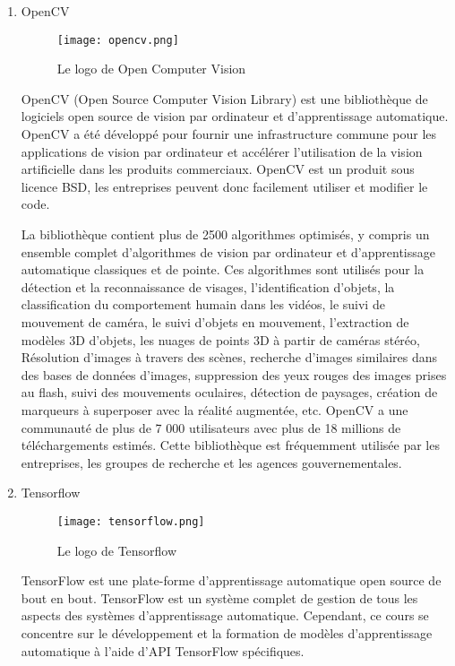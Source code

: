 \begin{enumerate}
        \bfseries
        \item OpenCV
        \begin{figure}[H]
            \centering
            \texttt{[image: opencv.png]}
            \caption{Le logo de Open Computer Vision}\label{fig:opencv}
        \end{figure}
        \normalfont
        OpenCV (Open Source Computer Vision Library) est une bibliothèque de logiciels open source de vision par ordinateur et d'apprentissage automatique. OpenCV a été développé pour fournir une infrastructure commune pour les applications de vision par ordinateur et  accélérer l'utilisation de la vision artificielle dans les produits commerciaux. OpenCV est un produit sous licence BSD, les entreprises peuvent donc facilement utiliser et  modifier  le code.
        
        La bibliothèque contient plus de 2500 algorithmes optimisés, y compris un ensemble complet d'algorithmes de vision par ordinateur et d'apprentissage automatique classiques et  de pointe. Ces algorithmes sont utilisés pour la détection et la reconnaissance de visages, l'identification d'objets, la classification du comportement humain dans les vidéos, le suivi de mouvement de caméra, le suivi d'objets en mouvement, l'extraction de modèles 3D d'objets, les nuages de points 3D à partir de caméras stéréo, Résolution d'images à travers des scènes, recherche d'images similaires dans des bases de données d'images, suppression des yeux rouges des images prises au flash, suivi des mouvements oculaires, détection de paysages, création de marqueurs à superposer avec la réalité augmentée, etc. OpenCV a une communauté de plus de 7 000 utilisateurs avec plus de 18 millions de téléchargements estimés. Cette bibliothèque est fréquemment utilisée par les entreprises, les groupes de recherche et les agences gouvernementales.

        \bfseries
        \item Tensorflow
        \begin{figure}[H]
            \centering
            \texttt{[image: tensorflow.png]}
            \caption{Le logo de Tensorflow}\label{fig:tensorflow}
        \end{figure}
        \normalfont
        TensorFlow est une plate-forme d'apprentissage automatique open source de bout en bout. TensorFlow est un système complet de gestion de tous les aspects des systèmes d'apprentissage automatique. Cependant, ce cours se concentre sur le développement et la formation de modèles d'apprentissage automatique à l'aide d'API TensorFlow spécifiques. 
        

\end{enumerate}
